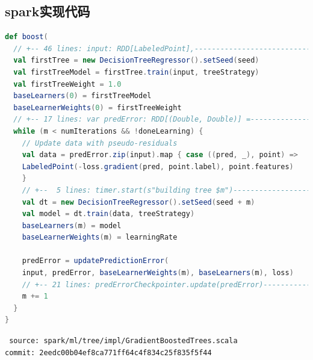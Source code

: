 \subsection{spark实现代码}
\begin{frame}[fragile]
    \begin{lstlisting}[language=Scala,style=myScalastyle]
def boost(
  // +-- 46 lines: input: RDD[LabeledPoint],------------------------------
  val firstTree = new DecisionTreeRegressor().setSeed(seed)
  val firstTreeModel = firstTree.train(input, treeStrategy)
  val firstTreeWeight = 1.0
  baseLearners(0) = firstTreeModel
  baseLearnerWeights(0) = firstTreeWeight
  // +-- 17 lines: var predError: RDD[(Double, Double)] =-----------------
  while (m < numIterations && !doneLearning) {
    // Update data with pseudo-residuals
    val data = predError.zip(input).map { case ((pred, _), point) =>
    LabeledPoint(-loss.gradient(pred, point.label), point.features)
    }
    // +--  5 lines: timer.start(s"building tree $m")----------------------
    val dt = new DecisionTreeRegressor().setSeed(seed + m)
    val model = dt.train(data, treeStrategy)
    baseLearners(m) = model
    baseLearnerWeights(m) = learningRate

    predError = updatePredictionError(
    input, predError, baseLearnerWeights(m), baseLearners(m), loss)
    // +-- 21 lines: predErrorCheckpointer.update(predError)---------------
    m += 1
  }
}
    \end{lstlisting}
    {\tiny \tt
    source: spark/ml/tree/impl/GradientBoostedTrees.scala \\[-2ex]
    commit: 2eedc00b04ef8ca771ff64c4f834c25f835f5f44}
\end{frame}
